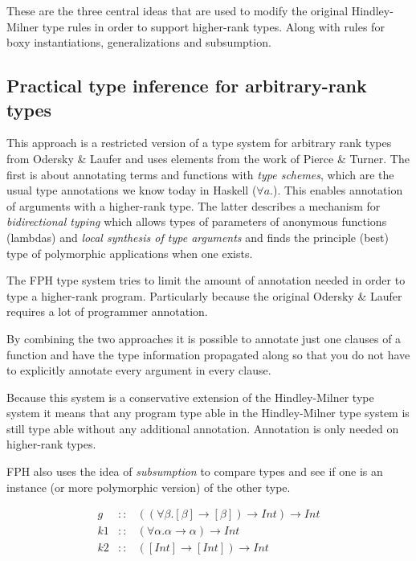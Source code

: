 \documentclass[twoside, titlepage, openright, a4paper]{book}
\begin{document}
These are the three central ideas that are used to modify the original Hindley-Milner type rules in order to support higher-rank types. Along with rules for boxy instantiations, generalizations and subsumption.

\subsection{Practical type inference for arbitrary-rank types\cite{boring}}
This approach is a restricted version of a type system for arbitrary rank types from Odersky \& Laufer\cite{odesky} and uses elements from the work of Pierce \& Turner\cite{pierce}. The first is about annotating terms and functions with \textit{type schemes}, which are the usual type annotations we know today in Haskell ($\forall a.$). This enables annotation of arguments with a higher-rank type. The latter describes a mechanism for \textit{bidirectional typing} which allows types of parameters of anonymous functions (lambdas) and \textit{local synthesis of type arguments} and finds the principle (best) type of polymorphic applications when one exists.

The FPH type system tries to limit the amount of annotation needed in order to type a higher-rank program. Particularly because the original Odersky \& Laufer\cite{odesky} requires a lot of programmer annotation.

By combining the two approaches it is possible to annotate just one clauses of a function and have the type information propagated along so that you do not have to explicitly annotate every argument in every clause.

Because this system is a conservative extension of the Hindley-Milner type system it means that any program type able in the Hindley-Milner type system is still type able without any additional annotation. Annotation is only needed on higher-rank types.

FPH also uses the idea of \textit{subsumption} to compare types and see if one is an instance (or more polymorphic version) of the other type. 

\begin{eqnarray*}
g  &::& ((\forall\beta.[\beta] \rightarrow [\beta]) \rightarrow Int) \rightarrow Int \\
k1 &::& (\forall\alpha. \alpha \rightarrow \alpha) \rightarrow Int\\
k2 &::& ([Int] \rightarrow [Int]) \rightarrow Int
\end{eqnarray*}
\end{document}
